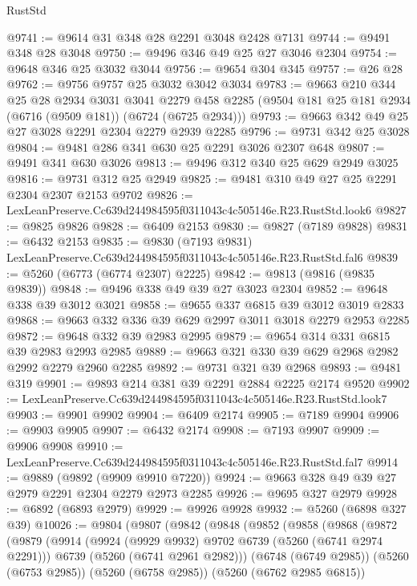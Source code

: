 \begin{lexlean}{RustStd}
\begin{coremodule}
@9741 := @9614 @31 @348 @28 @2291 @3048 @2428 @7131
@9744 := @9491 @348 @28 @3048
@9750 := @9496 @346 @49 @25 @27 @3046 @2304
@9754 := @9648 @346 @25 @3032 @3044
@9756 := @9654 @304 @345
@9757 := @26 @28
@9762 := @9756 @9757 @25 @3032 @3042 @3034
@9783 := @9663
    @210
    @344
    @25
    @28
    @2934
    @3031
    @3041
    @2279
    @458
    @2285
    (@9504 @181 @25 @181 @2934 (@6716 (@9509 @181)) (@6724 (@6725 @2934)))
@9793 := @9663 @342 @49 @25 @27 @3028 @2291 @2304 @2279 @2939 @2285
@9796 := @9731 @342 @25 @3028
@9804 := @9481 @286 @341 @630 @25 @2291 @3026 @2307 @648
@9807 := @9491 @341 @630 @3026
@9813 := @9496 @312 @340 @25 @629 @2949 @3025
@9816 := @9731 @312 @25 @2949
@9825 := @9481 @310 @49 @27 @25 @2291 @2304 @2307 @2153 @9702
@9826 := LexLeanPreserve.Cc639d244984595f0311043c4c505146e.R23.RustStd.look6
@9827 := @9825 @9826
@9828 := @6409 @2153
@9830 := @9827 (@7189 @9828)
@9831 := @6432 @2153
@9835 := @9830 (@7193 @9831) LexLeanPreserve.Cc639d244984595f0311043c4c505146e.R23.RustStd.fal6
@9839 := @5260 (@6773 (@6774 @2307) @2225)
@9842 := @9813 (@9816 (@9835 @9839))
@9848 := @9496 @338 @49 @39 @27 @3023 @2304
@9852 := @9648 @338 @39 @3012 @3021
@9858 := @9655 @337 @6815 @39 @3012 @3019 @2833
@9868 := @9663 @332 @336 @39 @629 @2997 @3011 @3018 @2279 @2953 @2285
@9872 := @9648 @332 @39 @2983 @2995
@9879 := @9654 @314 @331 @6815 @39 @2983 @2993 @2985
@9889 := @9663 @321 @330 @39 @629 @2968 @2982 @2992 @2279 @2960 @2285
@9892 := @9731 @321 @39 @2968
@9893 := @9481 @319
@9901 := @9893 @214 @381 @39 @2291 @2884 @2225 @2174 @9520
@9902 := LexLeanPreserve.Cc639d244984595f0311043c4c505146e.R23.RustStd.look7
@9903 := @9901 @9902
@9904 := @6409 @2174
@9905 := @7189 @9904
@9906 := @9903 @9905
@9907 := @6432 @2174
@9908 := @7193 @9907
@9909 := @9906 @9908
@9910 := LexLeanPreserve.Cc639d244984595f0311043c4c505146e.R23.RustStd.fal7
@9914 := @9889 (@9892 (@9909 @9910 @7220))
@9924 := @9663 @328 @49 @39 @27 @2979 @2291 @2304 @2279 @2973 @2285
@9926 := @9695 @327 @2979
@9928 := @6892 (@6893 @2979)
@9929 := @9926 @9928
@9932 := @5260 (@6898 @327 @39)
@10026 := @9804
    (@9807
      (@9842
        (@9848
          (@9852
            (@9858
              (@9868
                (@9872
                  (@9879
                    (@9914
                      (@9924 (@9929 @9932) @9702 @6739 (@5260 (@6741 @2974 @2291)))
                      @6739
                      (@5260 (@6741 @2961 @2982)))
                    (@6748 (@6749 @2985))
                    (@5260 (@6753 @2985))
                    (@5260 (@6758 @2985))
                    (@5260 (@6762 @2985 @6815))

\end{coremodule}
\end{lexlean}

